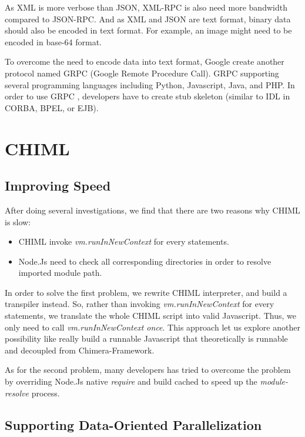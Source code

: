 \documentclass[conference]{IEEEtran}
\begin{document}
As XML is more verbose than JSON, XML-RPC is also need more bandwidth compared to JSON-RPC. And as XML and JSON are text format, binary data should also be encoded in text format. For example, an image might need to be encoded in base-64 format.

To overcome the need to encode data into text format, Google create another protocol named GRPC (Google Remote Procedure Call). GRPC supporting several programming languages including Python, Javascript, Java, and PHP. In order to use GRPC \cite{grpc}, developers have to create stub skeleton (similar to IDL in CORBA, BPEL, or EJB).

\section{CHIML}

\subsection{Improving Speed}

After doing several investigations, we find that there are two reasons why CHIML is slow:

\begin{itemize}
    \item CHIML invoke {\it vm.runInNewContext} for every statements.
    \item Node.Js need to check all corresponding directories in order to resolve imported module path.
\end{itemize}

In order to solve the first problem, we rewrite CHIML interpreter, and build a transpiler instead. So, rather than invoking {\it vm.runInNewContext} for every statements, we translate the whole CHIML script into valid Javascript. Thus, we only need to call {\it vm.runInNewContext once}. This approach let us explore another possibility like really build a runnable Javascript that theoretically is runnable and decoupled from Chimera-Framework.

As for the second problem, many developers has tried to overcome the problem by overriding Node.Js native {\it require} and build cached to speed up the {\it module-resolve} process.

\subsection{Supporting Data-Oriented Parallelization}
\end{document}
